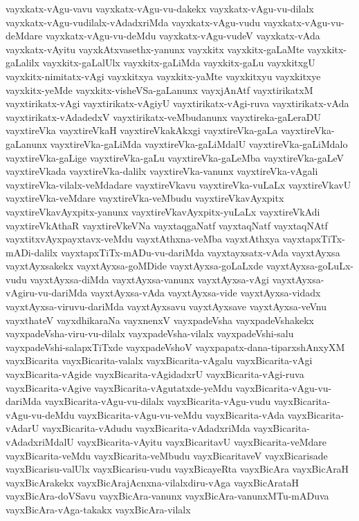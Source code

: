 {vayxkatx-vAgu-vavu
vayxkatx-vAgu-vu-dakekx
vayxkatx-vAgu-vu-dilalx
vayxkatx-vAgu-vudilalx-vAdadxriMda
vayxkatx-vAgu-vudu
vayxkatx-vAgu-vu-deMdare
vayxkatx-vAgu-vu-deMdu
vayxkatx-vAgu-vudeV
vayxkatx-vAda
vayxkatx-vAyitu
vayxkAtxvasethx-yanunx
vayxkitx
vayxkitx-gaLaMte
vayxkitx-gaLalilx
vayxkitx-gaLalUlx
vayxkitx-gaLiMda
vayxkitx-gaLu
vayxkitxgU
vayxkitx-nimitatx-vAgi
vayxkitxya
vayxkitx-yaMte
vayxkitxyu
vayxkitxye
vayxkitx-yeMde
vayxkitx-visheVSa-gaLanunx
vayxjAnAtf
vayxtirikatxM
vayxtirikatx-vAgi
vayxtirikatx-vAgiyU
vayxtirikatx-vAgi-ruva
vayxtirikatx-vAda
vayxtirikatx-vAdadedxV
vayxtirikatx-veMbudanunx
vayxtireka-gaLeraDU
vayxtireVka
vayxtireVkaH
vayxtireVkakAkxgi
vayxtireVka-gaLa
vayxtireVka-gaLanunx
vayxtireVka-gaLiMda
vayxtireVka-gaLiMdalU
vayxtireVka-gaLiMdalo
vayxtireVka-gaLige
vayxtireVka-gaLu
vayxtireVka-gaLeMba
vayxtireVka-gaLeV
vayxtireVkada
vayxtireVka-dalilx
vayxtireVka-vanunx
vayxtireVka-vAgali
vayxtireVka-vilalx-veMdadare
vayxtireVkavu
vayxtireVka-vuLaLx
vayxtireVkavU
vayxtireVka-veMdare
vayxtireVka-veMbudu
vayxtireVkavAyxpitx
vayxtireVkavAyxpitx-yanunx
vayxtireVkavAyxpitx-yuLaLx
vayxtireVkAdi
vayxtireVkAthaR
vayxtireVkeVNa
vayxtaqgaNatf
vayxtaqNatf
vayxtaqNAtf
vayxtitxvAyxpayxtavx-veMdu
vayxtAthxna-veMba
vayxtAthxya
vayxtapxTiTx-mADi-dalilx
vayxtapxTiTx-mADu-vu-dariMda
vayxtayxsatx-vAda
vayxtAyxsa
vayxtAyxsakekx
vayxtAyxsa-goMDide
vayxtAyxsa-goLaLxde
vayxtAyxsa-goLuLx-vudu
vayxtAyxsa-diMda
vayxtAyxsa-vanunx
vayxtAyxsa-vAgi
vayxtAyxsa-vAgiru-vu-dariMda
vayxtAyxsa-vAda
vayxtAyxsa-vide
vayxtAyxsa-vidadx
vayxtAyxsa-viruvu-dariMda
vayxtAyxsavu
vayxtAyxsave
vayxtAyxsa-veVnu
vayxthateV
vayxdhikaraNa
vayxnenxV
vayxpadeVsha
vayxpadeVshakekx
vayxpadeVsha-viru-vu-dilalx
vayxpadeVsha-vilalx
vayxpadeVshi-salu
vayxpadeVshi-salapxTiTxde
vayxpadeVshoV
vayxpapatx-dana-tiparxshAnxyXM
vayxBicarita
vayxBicarita-valalx
vayxBicarita-vAgalu
vayxBicarita-vAgi
vayxBicarita-vAgide
vayxBicarita-vAgidadxrU
vayxBicarita-vAgi-ruva
vayxBicarita-vAgive
vayxBicarita-vAgutatxde-yeMdu
vayxBicarita-vAgu-vu-dariMda
vayxBicarita-vAgu-vu-dilalx
vayxBicarita-vAgu-vudu
vayxBicarita-vAgu-vu-deMdu
vayxBicarita-vAgu-vu-veMdu
vayxBicarita-vAda
vayxBicarita-vAdarU
vayxBicarita-vAdudu
vayxBicarita-vAdadxriMda
vayxBicarita-vAdadxriMdalU
vayxBicarita-vAyitu
vayxBicaritavU
vayxBicarita-veMdare
vayxBicarita-veMdu
vayxBicarita-veMbudu
vayxBicaritaveV
vayxBicarisade
vayxBicarisu-valUlx
vayxBicarisu-vudu
vayxBicayeRta
vayxBicAra
vayxBicAraH
vayxBicArakekx
vayxBicArajAcnxna-vilalxdiru-vAga
vayxBicArataH
vayxBicAra-doVSavu
vayxBicAra-vanunx
vayxBicAra-vanunxMTu-mADuva
vayxBicAra-vAga-takakx
vayxBicAra-vilalx
}
